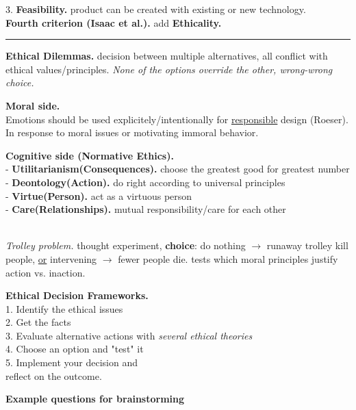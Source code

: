 \documentclass[8pt, a4paper]{extarticle}
\makeatletter
\renewcommand{\hline}{\noalign{\vskip 2px}\hrule\@height\arrayrulewidth\@width\linewidth\noalign{\vskip 2px}}
\makeatother
\begin{document}
\begin{minipage}[t]{0.48\textwidth}
{\begin{minipage}[t]{1\textwidth}
\begin{minipage}[t]{0.59\textwidth}
				3. \textbf{Feasibility.} product can be created with existing or new technology.\\
				\textbf{Fourth criterion (Isaac et al.).} add \textbf{Ethicality.}
			\end{minipage}
			\hline
			\textbf{Ethical Dilemmas.} decision between multiple alternatives, all conflict with ethical values/principles.
			\textit{None of the options override the other, wrong-wrong choice.}\\
			\begin{minipage}[t]{0.33\textwidth}
				\textbf{Moral side.}\\
				Emotions should be used explicitely/intentionally for \ul{responsible} design (Roeser). In response to moral issues or motivating immoral behavior.
			\end{minipage}\hfill\vline\hfill
			\begin{minipage}[t]{0.66\textwidth}
				\textbf{Cognitive side (Normative Ethics).}\\
				- \textbf{Utilitarianism(Consequences).} choose the greatest good for greatest number\\
				- \textbf{Deontology(Action).} do right according to universal principles\\
				- \textbf{Virtue(Person).} act as a virtuous person\\
				- \textbf{Care(Relationships).} mutual responsibility/care for each other
			\end{minipage}\\
			\textit{Trolley problem.} thought experiment, \textbf{choice}: do nothing $\to$ runaway trolley kill people,
			\ul{or} intervening $\to$ fewer people die. tests which moral principles justify action vs. inaction.\\
			\begin{minipage}[t]{0.33\textwidth}
				\textbf{Ethical Decision Frameworks.}\\
				1. Identify the ethical issues\\
				2. Get the facts\\
				3. Evaluate alternative actions with \textit{several ethical theories}\\
				4. Choose an option and "test" it\\
				5. Implement your decision and \\reflect on the outcome.
			\end{minipage}\hfill\vline\hfill
			\begin{minipage}[t]{0.66\textwidth}
				\textbf{Example questions for brainstorming}\\

\end{minipage}
\end{minipage}}
\end{minipage}
\end{document}
